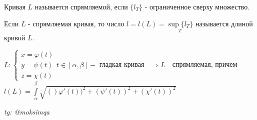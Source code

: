 \documentclass[../main.tex]{subfiles}
\begin{document}
\begin{definition}
    Кривая $L $ называется спрямляемой, если $\{l_{T}\}$ - ограниченное сверху множество.
\end{definition}
\begin{definition}
    Если $L$ - спрямляемая кривая, то число $l=l(L)=\underset{T}{\sup{\{l_{T}\}}}$ называется длиной кривой $L$. 
\end{definition}
\begin{theorem}
    $L: \begin{cases}
        x=\varphi(t)\\ y=\psi(t)\\ z=\chi(t)
    \end{cases} t \in [\alpha,\beta] - $ гладкая кривая $\implies L$ - спрямляемая, причем\\ $l(L)=\int\limits_{\alpha}^{\beta}\sqrt{()\varphi'(t))^{2}+(\psi'(t))^{2}+(\chi'(t))^{2}} $ 
\end{theorem}

\vspace{1cm}
\begin{flushright}
    \textit{tg: @moksimqa}
\end{flushright}
\end{document}

